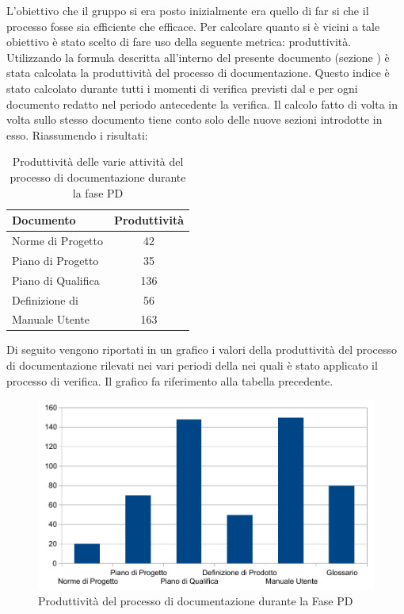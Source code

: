 				L'obiettivo che il gruppo si era posto inizialmente era quello di far si che il processo fosse sia efficiente che efficace. Per calcolare quanto si è vicini a tale obiettivo è stato scelto di fare uso della seguente metrica: produttività.\\
				Utilizzando la formula descritta all'interno del presente documento (sezione ) è stata calcolata la produttività del processo di documentazione. Questo indice è stato calcolato durante tutti i momenti di verifica previsti dal  e per ogni documento redatto nel periodo antecedente la verifica. Il calcolo fatto di volta in volta sullo stesso documento tiene conto solo delle nuove sezioni introdotte in esso. Riassumendo i risultati:
				\begin{table}[H]
			    	\centering
					\begin{tabu}{| l | c |}
						\hline
						Documento                 & Produttività   \\ \hline \hline
						Norme di Progetto	      & 42             \\ \hline
						Piano di Progetto	      & 35             \\ \hline
						Piano di Qualifica	      & 136            \\ \hline
						Definizione di    & 56             \\ \hline
						Manuale Utente            & 163            \\ \hline
					\end{tabu}
					\caption{Produttività delle varie attività del processo di documentazione durante la fase PD}
				\end{table}
				Di seguito vengono riportati in un grafico i valori della produttività del processo di documentazione rilevati nei vari periodi della  nei quali è stato applicato il processo di verifica. Il grafico fa riferimento alla tabella precedente.
				\begin{figure}[H]
					\centering
					\includegraphics[width=12cm]{PianoDiQualifica/Pics/ProduttivitaDocumentazioneFasePD.pdf}
					\caption{Produttività del processo di documentazione durante la Fase PD}
				\end{figure}
